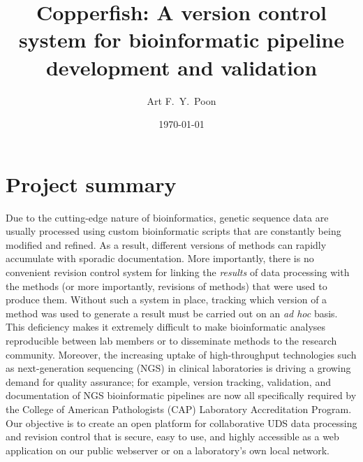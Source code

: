 \documentclass[11pt]{article}
\begin{document}
\title{Copperfish: A version control system for bioinformatic pipeline development and validation}
\author{Art F.~Y.~Poon}
\date{\today}
\maketitle


\baselineskip 22pt

\section {Project summary}

Due to the cutting-edge nature of bioinformatics, genetic sequence data are usually processed using custom bioinformatic scripts that are constantly being modified and refined. As a result, different versions of methods can rapidly accumulate with sporadic documentation. More importantly, there is no convenient revision control system for linking the {\em results} of data processing with the methods (or more importantly, revisions of methods) that were used to produce them. Without such a system in place, tracking which version of a method was used to generate a result must be carried out on an \textit{ad hoc} basis. This deficiency makes it extremely difficult to make bioinformatic analyses reproducible between lab members or to disseminate methods to the research community. Moreover, the increasing uptake of high-throughput technologies such as next-generation sequencing (NGS) in clinical laboratories is driving a growing demand for quality assurance; for example, version tracking, validation, and documentation of NGS bioinformatic pipelines are now all specifically required by the College of American Pathologists (CAP) Laboratory Accreditation Program. Our objective is to create an open platform for collaborative UDS data processing and revision control that is secure, easy to use, and highly accessible as a web application on our public webserver or on a laboratory's own local network.
\end{document}
